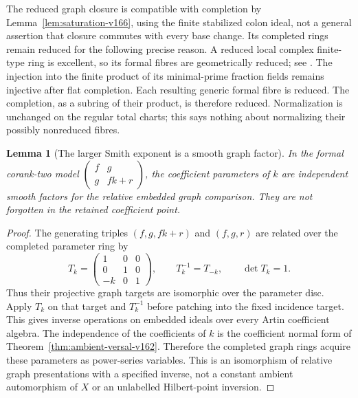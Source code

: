 \documentclass[11pt,reqno]{amsart}
\numberwithin{equation}{section}
\newtheorem{lemma}[theorem]{Lemma}
\theoremstyle{definition}\newtheorem{definition}[theorem]{Definition}
\theoremstyle{remark}\newtheorem{remark}[theorem]{Remark}
\begin{document}
The reduced graph closure is compatible with completion by
Lemma~\ref{lem:saturation-v166}, using the finite stabilized colon
ideal, not a general assertion that closure commutes with every base
change. Its completed rings remain reduced for the following precise
reason. A reduced local complex finite-type ring is excellent, so its
formal fibres are geometrically reduced; see
\cite[Tag 0BJ0]{Stacks166}. The injection into the finite product of
its minimal-prime fraction fields remains injective after flat
completion. Each resulting generic formal fibre is reduced.
The completion, as a subring of their product, is therefore reduced.
Normalization is unchanged on the regular total charts; this says
nothing about normalizing their possibly nonreduced fibres.

\begin{lemma}[The larger Smith exponent is a smooth graph factor]
\label{lem:larger-smith-v166}
In the formal corank-two model
$\left(\begin{smallmatrix}f&g\\g&fk+r\end{smallmatrix}\right)$,
the coefficient parameters of $k$ are independent smooth factors for
the relative embedded graph comparison. They are not forgotten in
the retained coefficient point.
\end{lemma}
\begin{proof}
The generating triples $(f,g,fk+r)$ and $(f,g,r)$ are related over
the completed parameter ring by
\[
 T_k=\begin{pmatrix}1&0&0\\0&1&0\\-k&0&1\end{pmatrix},
 \qquad T_k^{-1}=T_{-k},\qquad\det T_k=1.
\]
Thus their projective graph targets are isomorphic over the
parameter disc. Apply $T_k$ on that target and $T_k^{-1}$ before
patching into the fixed incidence target. This gives inverse
operations on embedded ideals over every Artin coefficient algebra.
The independence of the coefficients of $k$ is the coefficient
normal form of Theorem~\ref{thm:ambient-versal-v162}. Therefore
the completed graph rings acquire these parameters as power-series
variables. This is an isomorphism of relative graph presentations
with a specified inverse, not a constant ambient automorphism of
$X$ or an unlabelled Hilbert-point inversion.
\end{proof}
\end{document}

